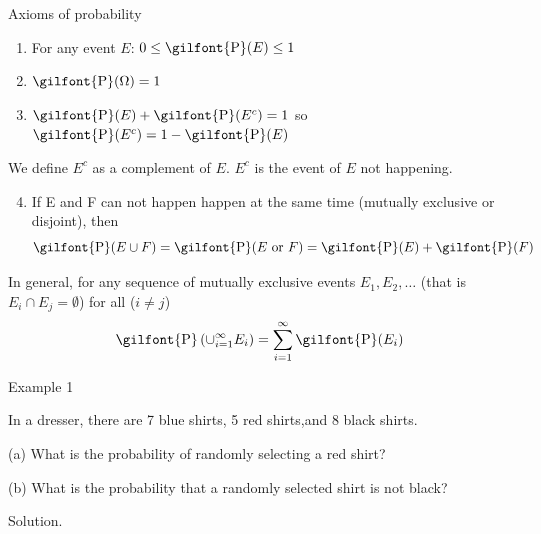 \documentclass[
  ignorenonframetext,
]{beamer}
\providecommand{\tightlist}{%
  \setlength{\itemsep}{0pt}\setlength{\parskip}{0pt}}
\begin{document}
\begin{frame}{Axioms of probability}
\label{axioms-of-probability}
\begin{enumerate}
\item
  For any event \(E\):
  \(0\leq \textrm{\gilfont{P}}\normalfont (E) \leq 1\)
\item
  \(\textrm{\gilfont{P}}\normalfont (\Omega)=1\)
\item
  \(\textrm{\gilfont{P}}\normalfont (E) + \textrm{\gilfont{P}}\normalfont (E^{c})=1\)
  so
  \(\textrm{\gilfont{P}}\normalfont (E^c)=1-\textrm{\gilfont{P}}\normalfont (E)\)
\end{enumerate}

We define \(E^{c}\) as a complement of \(E\). \(E^{c}\) is the event of
\(E\) not happening.

\begin{enumerate}
\setcounter{enumi}{3}
\tightlist
\item
  If E and F can not happen happen at the same time (mutually exclusive
  or disjoint), then
  \[\textrm{\gilfont{P}}\normalfont (E \cup F)=\textrm{\gilfont{P}}\normalfont (E \text{ or } F)=\textrm{\gilfont{P}}\normalfont (E) + \textrm{\gilfont{P}}\normalfont (F)\]
\end{enumerate}

In general, for any sequence of mutually exclusive events
\(E_1, E_2, \ldots\) (that is \(E_i \cap E_j = \emptyset\)) for all
(\(i\neq j\))
\[\textrm{\gilfont{P}}\normalfont \left(\cup_{i=1}^{\infty} E_i\right)=\sum_{i=1}^{\infty} \textrm{\gilfont{P}}\normalfont (E_i)\]
\end{frame}

\begin{frame}{Example 1}
\label{example-1}
\begin{tcolorbox}

In a dresser, there are 7 blue shirts, 5 red shirts,and 8 black shirts.

(a) What is the probability of randomly selecting a red shirt?

(b) What is the probability that a randomly selected shirt is not black?

\end{tcolorbox}

\pause

\begin{tcolorbox}
Solution.

\vspace{30mm}

\end{tcolorbox}
\end{frame}
\end{document}
